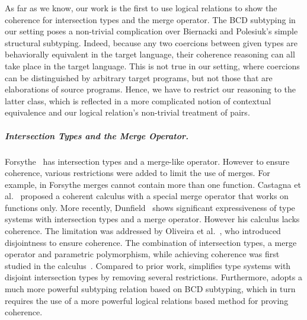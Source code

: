 As far as we know, our work is the first to use logical relations
to show the coherence for intersection types and the merge operator. The BCD
subtyping in our setting poses a non-trivial complication over Biernacki and
Polesiuk's simple structural subtyping. Indeed, because any two coercions
between given types are behaviorally equivalent in the target language, their
coherence reasoning can all take place in the target language. This is not true
in our setting, where coercions can be distinguished by arbitrary target
programs, but not those that are elaborations of source programs. Hence, we have to
restrict our reasoning to the latter class, which is reflected in a more
complicated notion of contextual equivalence and our logical relation's
non-trivial treatment of pairs.

\subparagraph{Intersection Types and the Merge Operator.}
Forsythe~\cite{reynolds1988preliminary} has intersection types and a merge-like operator. However to ensure coherence, various
restrictions were added to limit the use of merges. For example, in Forsythe
merges cannot contain more than one function. Castagna et al.~\cite{Castagna_1992} proposed a
coherent calculus with a special merge operator that works on functions only.
More recently, Dunfield~\cite{dunfield2014elaborating} shows significant expressiveness
of type systems with intersection types and a merge operator. However his
calculus lacks coherence. The limitation was addressed by
Oliveira et al.~\cite{oliveira2016disjoint}, who introduced disjointness to ensure
coherence. The combination of intersection types, a merge operator and
parametric polymorphism, while achieving coherence was first studied in the
\fname calculus~\cite{alpuimdisjoint}. Compared to prior work, \name simplifies type systems
with disjoint intersection types by removing several restrictions. 
Furthermore, \name adopts a much more powerful subtyping relation based 
on BCD subtyping, which in turn requires the use of a more powerful
logical relations based method for proving coherence.




